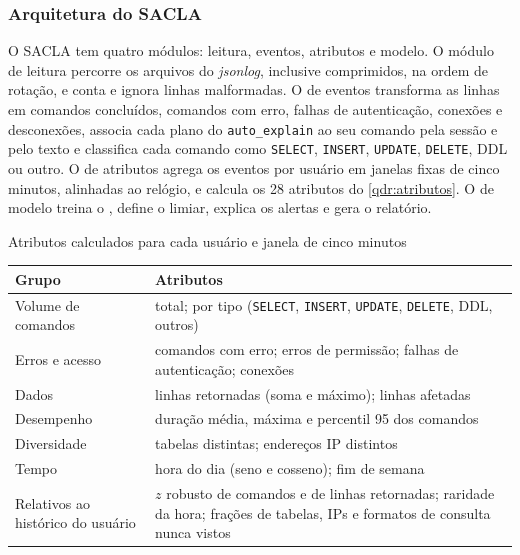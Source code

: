 \subsubsection{Arquitetura do SACLA}

O SACLA tem quatro módulos: leitura, eventos, atributos e modelo. O módulo de leitura percorre os
arquivos do \textit{jsonlog}, inclusive comprimidos, na ordem de rotação, e conta e ignora linhas
malformadas. O de eventos transforma as linhas em comandos concluídos, comandos com erro, falhas
de autenticação, conexões e desconexões, associa cada plano do \texttt{auto\_explain} ao seu
comando pela sessão e pelo texto e classifica cada comando como \texttt{SELECT},
\texttt{INSERT}, \texttt{UPDATE}, \texttt{DELETE}, DDL ou outro. O de atributos agrega os
eventos por usuário em janelas fixas de cinco minutos, alinhadas ao relógio, e calcula os 28
atributos do \autoref{qdr:atributos}. O de modelo treina o \iforest{}, define o limiar, explica
os alertas e gera o relatório.

\begin{quadro}[htb]
    \centering
    \ABNTEXfontereduzida
    \begin{minipage}{\textwidth}
        \caption{\label{qdr:atributos}Atributos calculados para cada usuário e janela de cinco
        minutos}
        \begin{tabular}{|L{4.0cm}|L{11.1cm}|}
            \hline
            \textbf{Grupo} & \textbf{Atributos} \\
            \hline
            Volume de comandos & total; por tipo (\texttt{SELECT}, \texttt{INSERT},
            \texttt{UPDATE}, \texttt{DELETE}, DDL, outros) \\
            \hline
            Erros e acesso & comandos com erro; erros de permissão; falhas de autenticação;
            conexões \\
            \hline
            Dados & linhas retornadas (soma e máximo); linhas afetadas \\
            \hline
            Desempenho & duração média, máxima e percentil 95 dos comandos \\
            \hline
            Diversidade & tabelas distintas; endereços IP distintos \\
            \hline
            Tempo & hora do dia (seno e cosseno); fim de semana \\
            \hline
            Relativos ao histórico do usuário & $z$ robusto de comandos e de linhas retornadas;
            raridade da hora; frações de tabelas, IPs e formatos de consulta nunca vistos \\
            \hline
        \end{tabular}
    \end{minipage}
\end{quadro}

